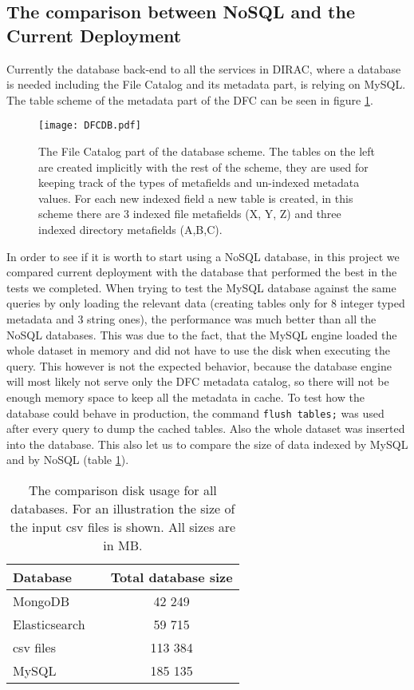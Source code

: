 \subsection{The comparison between NoSQL and the Current Deployment}

Currently the database back-end to all the services in DIRAC, where a database is needed including the File 
Catalog and its metadata part, is relying on MySQL. The table scheme of the metadata part of the DFC can be seen 
in figure \ref{fig:DFCUML}.

\begin{figure}[h]
	\centering
	\texttt{[image: DFCDB.pdf]}
	\caption{The File Catalog part of the database scheme. The tables on the left are created implicitly with the
	rest of the scheme, they are used  for keeping track of the types of metafields and un-indexed  metadata 
	values. For each new indexed field a new table is created, in this scheme there are 3 indexed file metafields
	(X, Y, Z) and three indexed directory metafields (A,B,C).}
	\label{fig:DFCUML}
\end{figure}

In order to see if it is worth to start using a NoSQL database, in this project we compared current deployment  
with the database that performed the
best in the tests we completed. When trying to test the MySQL database against the same queries 
by only loading the relevant data (creating tables only for 8 integer typed metadata and 3 string ones), the 
performance was much better than all the NoSQL databases. This was due to the fact, that the MySQL engine loaded
the whole dataset in memory and did not have to use the disk when executing the query. This however is not the expected 
behavior, because the database engine will most likely not serve only the DFC metadata catalog, so there will not
be enough memory space to keep all the metadata in cache. To test how the database could behave in production, the 
command \texttt{flush tables;} was used after every query to dump the cached tables. Also the whole dataset
was inserted into the database. This also let us to compare the size of data indexed by MySQL and by NoSQL (table 
\ref{tab:allDbSizes}). 

\begin{table}[h]
\centering
\label{tab:allDbSizes}
\begin{tabular}{lcc}
\toprule
\textbf{Database}      & & \textbf{Total database size}  \\ 
\midrule
MongoDB                & & 42 249                        \\ 
Elasticsearch          & & 59 715                        \\ 
csv files              & & 113 384                       \\ 
MySQL                  & & 185 135                       \\ 
\toprule
\end{tabular}
\caption{The comparison disk usage for all databases. For an illustration the size of the input csv files is
shown. All sizes are in MB.}
\end{table}

